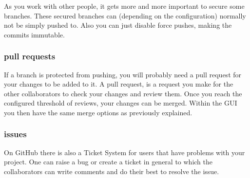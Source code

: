 \documentclass[a4paper, 12pt]{article}
\begin{document}
			As you work with other people, it gets more and more important to secure some branches. These secured branches can (depending on the configuration) normally not be simply pushed to. Also you can just disable force pushes, making the commits immutable.
		
		\subsubsection{pull requests}
		
			If a branch is protected from pushing, you will probably need a pull request for your changes to be added to it. A pull request, is a request you make for the other collaborators to check your changes and review them. Once you reach the configured threshold of reviews, your changes can be merged. Within the GUI you then have the same merge options as previously explained.
		
		\subsubsection{issues}
		
			On GitHub there is also a Ticket System for users that have problems with your project. One can raise a bug or create a ticket in general to which the collaborators can write comments and do their best to resolve the issue.
\end{document}
